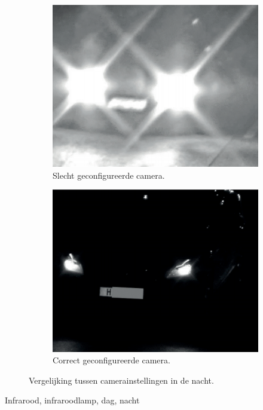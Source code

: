 \begin{figure}[h!]
	\centering
	\begin{subfigure}[b]{0.4\linewidth}
		\includegraphics[width=\linewidth]{img/night-time-lpc-bad.png}
		\caption{Slecht geconfigureerde camera.}
	\end{subfigure}
	\begin{subfigure}[b]{0.4\linewidth}
		\includegraphics[width=\linewidth]{img/night-time-lpc-good.png}
		\caption{Correct geconfigureerde camera.}
	\end{subfigure}
	\caption{Vergelijking tussen camerainstellingen in de nacht. \autocite{axis2019license}}
\end{figure}
Infrarood, infraroodlamp, dag, nacht


